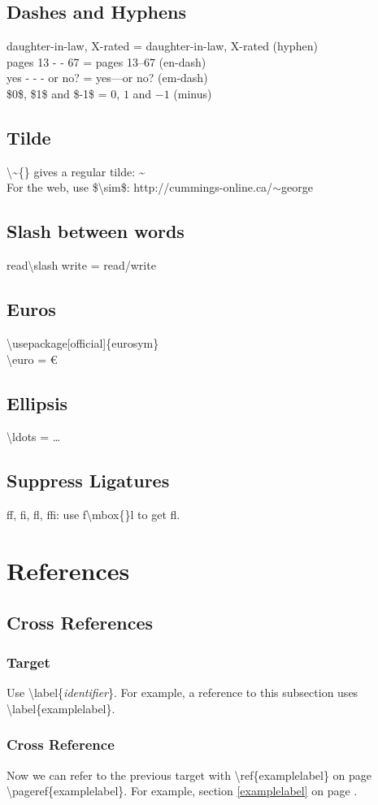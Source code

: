 \documentclass[letterpaper,12pt]{article}
\begin{document}
\subsection{Dashes and Hyphens}
daughter-in-law, X-rated = daughter-in-law, X-rated (hyphen)\\
pages 13 - - 67 = pages 13--67 (en-dash)\\
yes - - - or no? = yes---or no? (em-dash)\\
\$0\$, \$1\$ and \$-1\$ = $0$, $1$ and $-1$ (minus) 
\subsection{Tilde}
\textbackslash\~{}\{\} gives a regular tilde: \~{} \\
For the web, use \$\textbackslash sim\$: http://cummings-online.ca/$\sim$george
\subsection{Slash between words}
read\textbackslash slash write = read\slash write
\subsection{Euros}
\textbackslash usepackage[official]\{eurosym\} \\
\textbackslash euro = \euro
\subsection{Ellipsis}
\textbackslash ldots = \ldots
\subsection{Suppress Ligatures}
ff, fi, fl, ffi: use f\textbackslash mbox\{\}l to get f\mbox{}l.
\section{References}
\subsection{Cross References}
\subsubsection{Target}
Use \textbackslash label\{\emph{identifier}\}. For example, a reference to this \label{examplelabel}
subsection uses \textbackslash label\{examplelabel\}.
\subsubsection{Cross Reference}
Now we can refer to the previous target with \textbackslash ref\{examplelabel\} on page
\textbackslash pageref\{examplelabel\}. For example, section \ref{examplelabel} on page
\pageref{examplelabel}.
\end{document}
